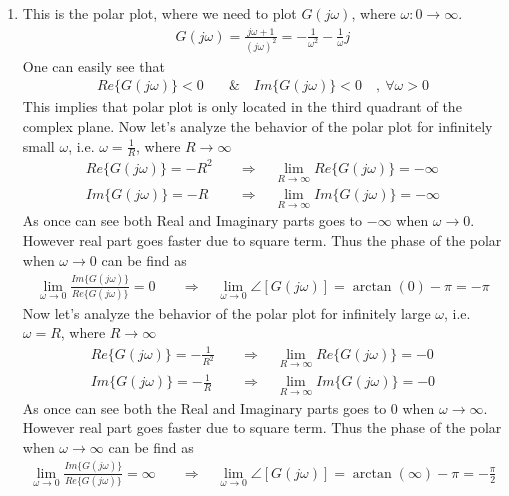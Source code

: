 \documentclass{article}
\begin{document}
\begin{enumerate}
  \item This is the polar plot, where we need to plot $G(j \omega)$, where $\omega : 0 \to
    \infty$. 
    \begin{align*}
      G(j \omega) = \frac{j \omega + 1}{ (j \omega)^2} =  -\frac{1}{ \omega^2} - \frac{1}{ \omega} j
    \end{align*}
%
   One can easily see that 
    \begin{align*}
       Re \lbrace G(j \omega) \rbrace < 0 \quad & \&  \quad  Im \lbrace G(j
                                                \omega) \rbrace < 0 \quad , \ \forall  \omega > 0 
     \end{align*}
   This implies that polar plot is only located in the third quadrant of the complex plane. Now let's analyze the behavior of the 
   polar plot for infinitely small $\omega$, i.e. $\omega = \frac{1}{R}$, where $R \to \infty$
    \begin{align*}
    	Re \lbrace G(j \omega) \rbrace = -R^2  \quad & \Rightarrow \quad  \lim_{R \to \infty} Re \lbrace G(j \omega) \rbrace = -\infty
	\\
	Im \lbrace G(j \omega) \rbrace = -R  \quad & \Rightarrow \quad  \lim_{R \to \infty} Im \lbrace G(j \omega) \rbrace = -\infty
      \end{align*}
      As once can see both Real and Imaginary parts goes to $-\infty$ when $\omega \to 0$. However real part goes faster due to 
      square term. Thus the phase of the polar when $\omega \to 0$ can be find as 
	\begin{align*}  
      		\lim_{\omega \to 0} \frac{Im \lbrace G(j \omega) \rbrace}{Re \lbrace G(j \omega) \rbrace} = 0 
		\quad & \Rightarrow \quad  \lim_{\omega \to 0}  \angle [ G(j \omega) ] = \arctan( 0 ) -\pi = -\pi
	\end{align*}
   Now let's analyze the behavior of the polar plot for infinitely large $\omega$, i.e. $\omega = R$, where $R \to \infty$
    \begin{align*}
    	Re \lbrace G(j \omega) \rbrace = -\frac{1}{R^2}  \quad & \Rightarrow \quad  \lim_{R \to \infty} Re \lbrace G(j \omega) \rbrace = -0
	\\
	Im \lbrace G(j \omega) \rbrace = -\frac{1}{R}   \quad & \Rightarrow \quad  \lim_{R \to \infty} Im \lbrace G(j \omega) \rbrace = -0
      \end{align*}
         As once can see both the Real and Imaginary parts goes to $0$ when $\omega \to \infty$. However real part goes faster due to 
      square term. Thus the phase of the polar when $\omega \to \infty$ can be find as 
	\begin{align*}  
      		\lim_{\omega \to 0} \frac{Im \lbrace G(j \omega) \rbrace}{Re \lbrace G(j \omega) \rbrace} = \infty 
		\quad & \Rightarrow \quad  \lim_{\omega \to 0}  \angle [ G(j \omega) ] = \arctan( \infty ) -\pi = -\frac{\pi}{2}
	\end{align*}
 

\end{enumerate}
\end{document}
